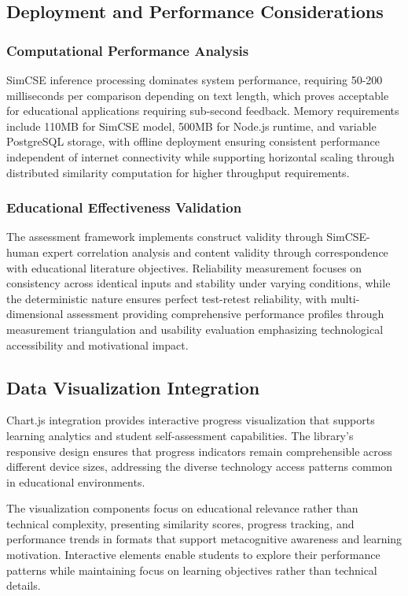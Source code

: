 {\subsection{Deployment and Performance Considerations}

\subsubsection{Computational Performance Analysis}

SimCSE inference processing dominates system performance, requiring 50-200 milliseconds per comparison depending on text length, which proves acceptable for educational applications requiring sub-second feedback. Memory requirements include 110MB for SimCSE model, 500MB for Node.js runtime, and variable PostgreSQL storage, with offline deployment ensuring consistent performance independent of internet connectivity while supporting horizontal scaling through distributed similarity computation for higher throughput requirements.

\subsubsection{Educational Effectiveness Validation}

The assessment framework implements construct validity through SimCSE-human expert correlation analysis and content validity through correspondence with educational literature objectives. Reliability measurement focuses on consistency across identical inputs and stability under varying conditions, while the deterministic nature ensures perfect test-retest reliability, with multi-dimensional assessment providing comprehensive performance profiles through measurement triangulation and usability evaluation emphasizing technological accessibility and motivational impact.

\subsection{Data Visualization Integration}

Chart.js integration provides interactive progress visualization that supports learning analytics and student self-assessment capabilities. The library's responsive design ensures that progress indicators remain comprehensible across different device sizes, addressing the diverse technology access patterns common in educational environments.

The visualization components focus on educational relevance rather than technical complexity, presenting similarity scores, progress tracking, and performance trends in formats that support metacognitive awareness and learning motivation. Interactive elements enable students to explore their performance patterns while maintaining focus on learning objectives rather than technical details.

}
